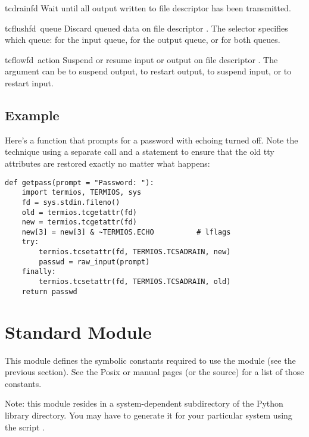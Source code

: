 \begin{funcdesc}{tcdrain}{fd}
Wait until all output written to file descriptor  has been
transmitted.
\end{funcdesc}

\begin{funcdesc}{tcflush}{fd\, queue}
Discard queued data on file descriptor .  The 
selector specifies which queue:  for the input
queue,  for the output queue, or
 for both queues.
\end{funcdesc}

\begin{funcdesc}{tcflow}{fd\, action}
Suspend or resume input or output on file descriptor .  The
 argument can be  to suspend output,
 to restart output,  to
suspend input, or  to restart input.
\end{funcdesc}

\subsection{Example}

Here's a function that prompts for a password with echoing turned off.
Note the technique using a separate  call
and a  statement to ensure that the old tty
attributes are restored exactly no matter what happens:

\begin{verbatim}
def getpass(prompt = "Password: "):
    import termios, TERMIOS, sys
    fd = sys.stdin.fileno()
    old = termios.tcgetattr(fd)
    new = termios.tcgetattr(fd)
    new[3] = new[3] & ~TERMIOS.ECHO          # lflags
    try:
        termios.tcsetattr(fd, TERMIOS.TCSADRAIN, new)
        passwd = raw_input(prompt)
    finally:
        termios.tcsetattr(fd, TERMIOS.TCSADRAIN, old)
    return passwd
\end{verbatim}


\section{Standard Module }

\renewcommand{\indexsubitem}{(in module TERMIOS)}

This module defines the symbolic constants required to use the
 module (see the previous section).  See the Posix or
\UNIX{} manual pages (or the source) for a list of those constants.

Note: this module resides in a system-dependent subdirectory of the
Python library directory.  You may have to generate it for your
particular system using the script .

